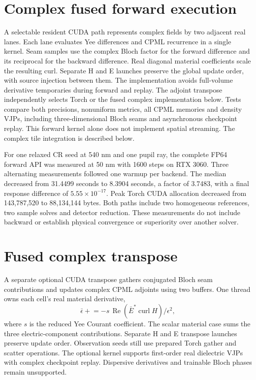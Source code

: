 \documentclass[11pt,a4paper]{article}
\begin{document}
\section{Complex fused forward execution}
A selectable resident CUDA path represents complex fields by two adjacent
real lanes. Each lane evaluates Yee differences and CPML recurrence in a
single kernel. Seam samples use the complex Bloch factor for the forward
difference and its reciprocal for the backward difference. Real diagonal
material coefficients scale the resulting curl. Separate H and E launches
preserve the global update order, with source injection between them.
The implementation avoids full-volume derivative temporaries during forward
and replay. The adjoint transpose independently selects Torch or the fused
complex implementation below. Tests compare
both precisions, nonuniform metrics, all CPML memories and density VJPs,
including three-dimensional Bloch seams and asynchronous checkpoint replay.
This forward kernel alone does not implement spatial streaming. The complex
tile integration is described below.

For one relaxed CR seed at 540 nm and one pupil ray, the complete FP64 forward
API was measured at 50 nm with 1600 steps on RTX 3060. Three alternating
measurements followed one warmup per backend. The median decreased from
31.4499 seconds to 8.3904 seconds, a factor of 3.7483, with a final response
difference of $5.55\times10^{-17}$. Peak Torch CUDA allocation decreased from
143,787,520 to 88,134,144 bytes. Both paths include two homogeneous references,
two sample solves and detector reduction. These measurements do not include
backward or establish physical convergence or superiority over another solver.

\section{Fused complex transpose}
A separate optional CUDA transpose gathers conjugated Bloch seam contributions
and updates complex CPML adjoints using two buffers. One thread owns each
cell's real material derivative,
\[
 \bar{\epsilon} \mathrel{+}=
 -s\,\operatorname{Re}\!\left(\bar{E}^{*}\operatorname{curl}H\right)
 /\epsilon^2,
\]
where $s$ is the reduced Yee Courant coefficient. The scalar material case sums
the three electric-component contributions. Separate H and E transpose launches
preserve update order. Observation seeds still use prepared Torch gather and
scatter operations. The optional kernel supports first-order real dielectric
VJPs with complex checkpoint replay. Dispersive derivatives and trainable
Bloch phases remain unsupported.
\end{document}
